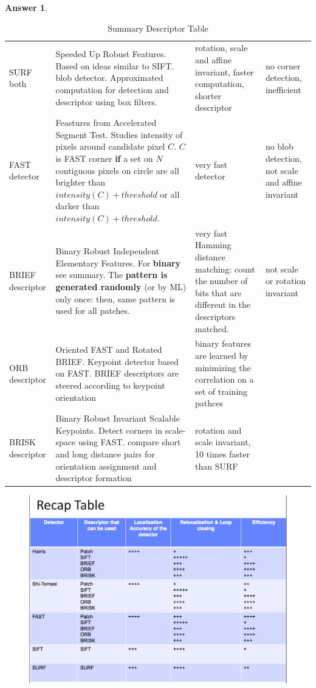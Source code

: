 \documentclass[a4paper,12 pt]{article}
\theoremstyle{definition}
\theoremstyle{remark}
\theoremstyle{definition}
\theoremstyle{definition}
\theoremstyle{definition}
\theoremstyle{definition}
\theoremstyle{remark}
\theoremstyle{remark}
\theoremstyle{definition}
\theoremstyle{definition}
\newtheorem*{answer}{Answer}
\begin{document}
\begin{enumerate}
\begin{answer}
\begin{table}[h!]
\begin{tabular}{l | p{7cm} p{3cm}  p{3cm} }
	SURF both &  Speeded Up Robust Features. Based on ideas similar to SIFT.  blob detector. Approximated computation for detection and descriptor using box filters. & rotation, scale and affine invariant, faster computation, shorter descriptor   & no corner detection, inefficient\\
	FAST detector& Feastures from Accelerated Segment Test. Studies intensity of pixels around candidate pixel $C$. $C$ is FAST corner \textbf{if} a set on $N$ contiguous pixels on circle are all brighter than $intensity(C)+threshold$ or all darker than $intensity(C)+threshold$. & very fast detector& no blob detection, not scale and affine invariant \\
BRIEF descriptor  & Binary Robust Independent Elementary Features. For \textbf{binary} see summary. The \textbf{pattern is generated randomly} (or by ML) only once: then, same pattern is used for all patches. &very fast Hamming distance matching: count the number of bits that are different in the descriptors matched. & not scale or rotation invariant\\
	ORB descriptor& Oriented FAST and Rotated BRIEF. Keypoint detector based on FAST. BRIEF descriptors are steered according to keypoint orientation& binary features are learned by minimizing the correlation on a set of training pathces&\\\setcounter{section}{4}
\setcounter{subsection}{0}\setcounter{section}{4}
\setcounter{subsection}{0}
	BRISK descriptor&Binary Robust Invariant Scalable Keypoints. Detect corners in scale-space using FAST. compare short and long distance pairs for orientation assignment and descriptor formation &rotation and scale invariant, 10 times faster than SURF & \\
	\hline
\end{tabular}
\caption{Summary Descriptor Table\label{tab:summary}}
\end{table}
\begin{figure}[h!]
\begin{center}
\includegraphics[scale=0.4]{pics/recap}

\end{center}
\end{figure}
\end{answer}
\end{enumerate}
\end{document}
